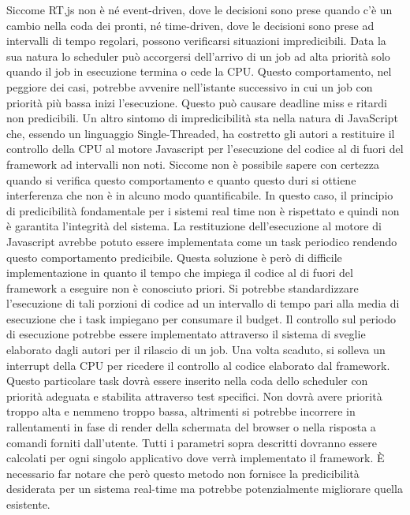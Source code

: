 \documentclass[conference]{IEEEtran}
\begin{document}
Siccome RT,js non è né event-driven, dove le decisioni sono prese quando c'è un cambio nella coda dei pronti, né time-driven, dove le decisioni sono prese ad intervalli di tempo regolari, possono verificarsi situazioni impredicibili. Data la sua natura lo scheduler può accorgersi dell'arrivo di un job ad alta priorità solo quando il job in esecuzione termina o cede la CPU. Questo comportamento, nel peggiore dei casi, potrebbe avvenire nell'istante successivo in cui un job con priorità più bassa inizi l'esecuzione. Questo può causare deadline miss e ritardi non predicibili.
\newline
Un altro sintomo di impredicibilità sta nella natura di JavaScript che, essendo un linguaggio Single-Threaded, ha costretto gli autori a restituire il controllo della CPU al motore Javascript per l'esecuzione del codice al di fuori del framework ad intervalli non noti. Siccome non è possibile sapere con certezza quando si verifica questo comportamento e quanto questo duri si ottiene interferenza che non è in alcuno modo quantificabile. In questo caso, il principio di predicibilità fondamentale per i sistemi real time non è rispettato e quindi non è garantita l'integrità del sistema. La restituzione dell'esecuzione al motore di Javascript avrebbe potuto essere implementata come un task periodico rendendo questo comportamento predicibile. Questa soluzione è però di difficile implementazione in quanto il tempo che impiega il codice al di fuori del framework a eseguire non è conosciuto priori. Si potrebbe standardizzare l'esecuzione di tali porzioni di codice ad un intervallo di tempo pari alla media di esecuzione che i task impiegano per consumare il budget. Il controllo sul periodo di esecuzione potrebbe essere implementato attraverso il sistema di sveglie elaborato dagli autori per il rilascio di un job. Una volta scaduto, si solleva un interrupt della CPU per ricedere il controllo al codice elaborato dal framework. Questo particolare task dovrà essere inserito nella coda dello scheduler con priorità adeguata e stabilita attraverso test specifici. Non dovrà avere priorità troppo alta e nemmeno troppo bassa, altrimenti si potrebbe incorrere in rallentamenti in fase di render della schermata del browser o nella risposta a comandi forniti dall'utente. Tutti i parametri sopra descritti dovranno essere calcolati per ogni singolo applicativo dove verrà implementato il framework. È necessario far notare che però questo metodo non fornisce la predicibilità desiderata per un sistema real-time ma potrebbe potenzialmente migliorare quella esistente. 
\end{document}

